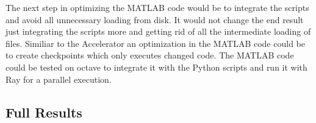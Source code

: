 \documentclass[12pt, a4paper]{article}
\begin{document}
The next step in optimizing the MATLAB code would be to integrate the scripts and avoid all unnecessary loading from disk.
It would not change the end result just integrating the scripts more and getting rid of all the intermediate loading of files.
Similiar to the Accelerator an optimization in the MATLAB code could be to create checkpoints which only executes changed code.
The MATLAB code could be tested on octave to integrate it with the Python scripts and run it with Ray for a parallel execution.




\begin{appendices}

\section{Full Results}


\end{appendices}
\end{document}
